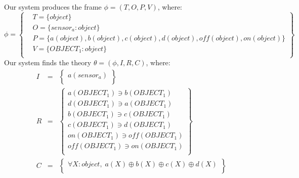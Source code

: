 Our system produces the frame $\phi = (T, O, P, V)$, where:
\begin{equation*}
\phi = \left \{
\begin{aligned}
& T = \{ 
object
\}\\
& O = \{
\mathit{sensor}_a: object
\}\\
& P = \{
\mathit{a}(object),\mathit{b}(object),\mathit{c}(object),\mathit{d}(object),\mathit{off}(object),\mathit{on}(object)
\}\\
& V = \{
OBJECT_1: object
\}\\
\end{aligned}\right\}
\end{equation*}
Our system finds the theory $\theta = (\phi, I, R, C)$, where:
\begin{eqnarray*}
I & = & \left\{ \begin{array}{l}
\mathit{a}(\mathit{sensor}_a)\\
\end{array}\right\}\\
R & = &  \left\{ \begin{array}{l}
\mathit{a}(\mathit{OBJECT}_1) \ni \mathit{b}(\mathit{OBJECT}_1)\\
\mathit{d}(\mathit{OBJECT}_1) \ni \mathit{a}(\mathit{OBJECT}_1)\\
\mathit{b}(\mathit{OBJECT}_1) \ni \mathit{c}(\mathit{OBJECT}_1)\\
\mathit{c}(\mathit{OBJECT}_1) \ni \mathit{d}(\mathit{OBJECT}_1)\\
\mathit{on}(\mathit{OBJECT}_1) \ni \mathit{off}(\mathit{OBJECT}_1)\\
\mathit{off}(\mathit{OBJECT}_1) \ni \mathit{on}(\mathit{OBJECT}_1)\\
\end{array}\right\}\\
C & = & \left\{ \begin{array}{l}
\forall X : object,\;\mathit{a}(X) \oplus \mathit{b}(X) \oplus \mathit{c}(X) \oplus \mathit{d}(X)\\
\end{array}\right\}\\
\end{eqnarray*}

